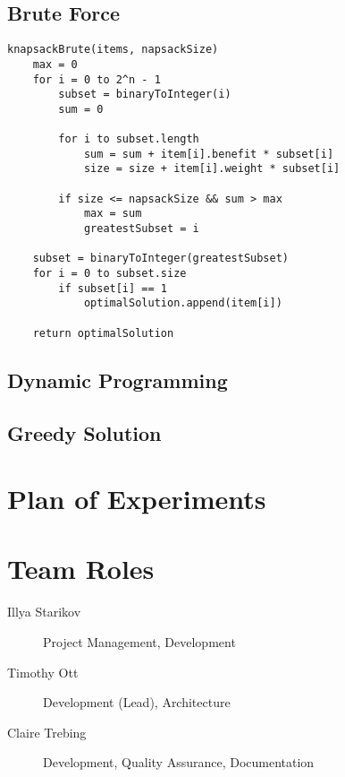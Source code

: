 \documentclass{article}
\begin{document}
\subsection{Brute Force}
\begin{Verbatim}
knapsackBrute(items, napsackSize)
    max = 0
    for i = 0 to 2^n - 1
        subset = binaryToInteger(i)
        sum = 0

        for i to subset.length
            sum = sum + item[i].benefit * subset[i]
            size = size + item[i].weight * subset[i]

        if size <= napsackSize && sum > max
            max = sum
            greatestSubset = i

    subset = binaryToInteger(greatestSubset)
    for i = 0 to subset.size
        if subset[i] == 1
            optimalSolution.append(item[i])

    return optimalSolution
\end{Verbatim}
\subsection{Dynamic Programming}
\subsection{Greedy Solution}


\section{Plan of Experiments}


\section{Team Roles}
\begin{description}
    \item [Illya Starikov] Project Management, Development
    \item [Timothy Ott] Development (Lead), Architecture
    \item [Claire Trebing] Development, Quality Assurance,  Documentation
\end{description}
\end{document}

